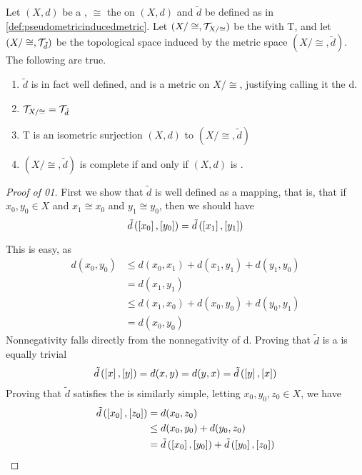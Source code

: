 \begin{prop}
    \label{prop:pseudometricinducedmetric}
    Let $(X,d)$ be a \PseudometricSpace, $\cong$ the \RelationOfZeroDistance on $(X,d)$ and $\tilde{d}$ be defined as in \ref{def:pseudometricinducedmetric}.
    Let $(X/\cong, \mathcal{T}_{X/\cong})$ be the  \QuotientTopologicalSpace with \QuotientMap T, and let $(X/\cong, \mathcal{T}_{\tilde{d}})$ be the topological space induced by the metric space $(X/\cong, \tilde{d})$. 
    The following are true. 
    \begin{enumerate}
        \item $\tilde{d}$ is in fact well defined, and is a metric on $X/\cong$, justifying calling it the \MetricInducedByPseudometric d.
        \item $\mathcal{T}_{X/\cong} = \mathcal{T}_{\tilde{d}}$
        \item T is an isometric surjection $(X,d)$ to $(X/\cong, \tilde{d})$
        \item $(X/\cong, \tilde{d})$ is complete if and only if $(X, d)$ is \PseudometricComplete.

    \end{enumerate}
    \begin{proof}[Proof of 01]
        First we show that $\tilde{d}$ is well defined as a mapping, that is, that if
        $x_0,y_0 \in X$ and $x_1 \cong x_0$ and $y_1 \cong y_0$, then we should have 
        \begin{equation}
            \tilde{d}\left( \left[ x_0 \right],\left[ y_0 \right]\right)=\tilde{d}\left( \left[ x_1 \right],\left[ y_1 \right]\right)
        \end{equation}
        
        This is easy, as
        \begin{align*}
            d(x_0,y_0) & \leq d(x_0,x_1)+d(x_1,y_1)+d(y_1,y_0)\\
            & = d(x_1,y_1)\\
            & \leq d(x_1,x_0)+d(x_0,y_0)+d(y_0,y_1)\\
            &=d(x_0,y_0)
         \end{align*}
         Nonnegativity falls directly from the nonnegativity of d. 
         Proving that $\tilde{d}$ is a \SymmetricMap is equally trivial
         \begin{align*}
             \tilde{d}\left( \left[ x \right], \left[ y \right]\right)= d(x,y) = d(y,x) = \tilde{d}\left( \left[ y \right], \left[ x \right]\right)
         \end{align*}
         Proving that $\tilde{d}$ satisfies the \TriangleInequality is similarly simple, letting $x_0,y_0,z_0 \in X$, we have
         \begin{align*}
             \tilde{d}\left( \left[ x_0 \right], \left[ z_0 \right]\right) & = d(x_0,z_0) \\
             & \leq d(x_0, y_0)+d(y_0, z_0)\\
             & = \tilde{d}\left( \left[ x_0 \right], \left[ y_0 \right]\right)+ \tilde{d}\left(  \left[ y_0 \right], \left[ z_0 \right]\right)
         \end{align*}
         

\end{proof}
\end{prop}
